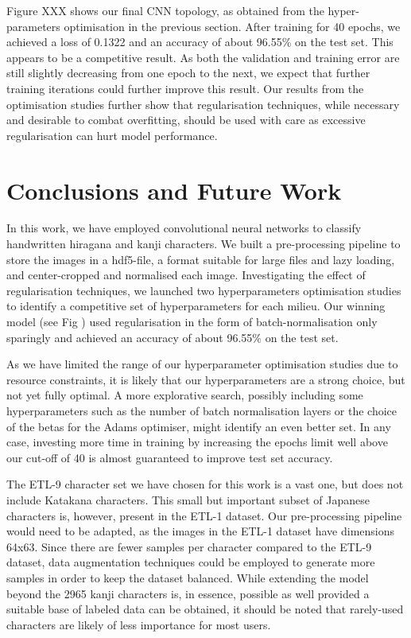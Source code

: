 \documentclass[british,12p]{article}
\begin{document}
    
    Figure XXX  shows our final CNN topology, as obtained from the hyper-parameters optimisation in the previous section. After training for 40 epochs, we achieved a loss of 0.1322 and an accuracy of about 96.55\% on the test set. This appears to be a competitive result. As both the validation and training error are still slightly decreasing from one epoch to the next, we expect that further training iterations could further improve this result. Our results from the optimisation studies further show that regularisation techniques, while necessary and desirable to combat overfitting, should be used with care as excessive regularisation can hurt model performance. 
    
    \section{Conclusions and Future Work}
    In this work, we have employed convolutional neural networks to classify handwritten hiragana and kanji characters. We built a pre-processing pipeline to store the images in a hdf5-file, a format suitable for large files and lazy loading, and center-cropped and normalised each image. Investigating the effect of regularisation techniques, we launched two hyperparameters optimisation studies to identify a competitive set of hyperparameters for each milieu. Our winning model (see Fig ) used regularisation in the form of batch-normalisation only sparingly and achieved an accuracy of about 96.55\% on the test set. 
    
    As we have limited the range of our hyperparameter optimisation studies due to resource constraints, it is likely that our hyperparameters are a strong choice, but not yet fully optimal. A more explorative search, possibly including some hyperparameters such as the number of batch normalisation layers or the choice of the betas for the Adams optimiser, might identify an even better set. In any case, investing more time in training by increasing the epochs limit well above our cut-off of 40 is almost guaranteed to improve test set accuracy. 
    
    The ETL-9 character set we have chosen for this work is a vast one, but does not include Katakana characters. This small but important subset of Japanese characters is, however, present in the ETL-1 dataset. Our pre-processing pipeline would need to be adapted, as the images in the ETL-1 dataset have dimensions 64x63. Since there are fewer samples per character compared to the ETL-9 dataset, data augmentation techniques could be employed to generate more samples in order to keep the dataset balanced. While extending the model beyond the 2965 kanji characters is, in essence, possible as well provided a suitable base of labeled data can be obtained, it should be noted that rarely-used characters are likely of less importance for most users.
    
\end{document}
